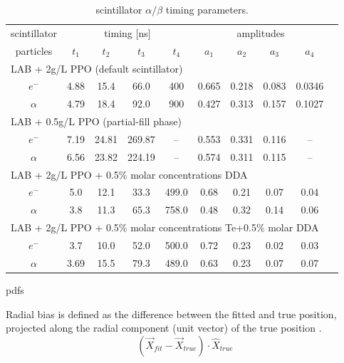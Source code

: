 \begin{table}[ht]
	\caption{\label{scint_timing} scintillator $\alpha/\beta$ timing parameters\cite{chicagoTiming,tanner0p5}.}	
	
	
	
	
	{\centering
		\begin{tabular*}{165mm}{c@{\extracolsep{\fill}}*9c}
			\toprule 
			\multicolumn{1}{c}{scintillator} & \multicolumn{4}{c}{timing [ns]} & \multicolumn{4}{c}{amplitudes}\\
			\cline{0-1}\cline{2-5} \cline{6-9}		
			 particles      & $t_1$ & $t_2$ & $t_3$ & $t_4$ & $a_1$ &$a_2$ &$a_3$&$a_4$\\
			\midrule
			\multicolumn{9}{l}{LAB + 2g/L PPO (default scintillator)}\\
			$e^-$ & 4.88 & 15.4 & 66.0 & 400 & 0.665 & 0.218 & 0.083& 0.0346\\	
		    $\alpha$ & 4.79 & 18.4 & 92.0 & 900 & 0.427 & 0.313 & 0.157 & 0.1027\\
		    \hline
		    \multicolumn{9}{l}{LAB + 0.5g/L PPO (partial-fill phase)} \\
			$e^-$& 7.19 & 24.81 & 269.87 & -- &0.553 &0.331 &0.116 & --\\
			$\alpha$& 6.56 &23.82 &224.19&--& 0.574&0.311& 0.115&--\\
			\hline
			\multicolumn{9}{l}{LAB + 2g/L PPO + 0.5\% molar concentrations DDA} \\
			$e^-$ & 5.0& 12.1& 33.3& 499.0& 0.68& 0.21& 0.07& 0.04\\
			$\alpha$ &3.8 &11.3& 65.3& 758.0& 0.48& 0.32& 0.14& 0.06 \\
			\hline
			\multicolumn{9}{l}{LAB + 2g/L PPO + 0.5\% molar concentrations Te+0.5\% molar DDA}\\
			$e^-$ & 3.7 & 10.0 & 52.0  & 500.0 & 0.72 & 0.23 & 0.02 &0.03\\
			$\alpha$ & 3.69 & 15.5 & 79.3  & 489.0 & 0.63 & 0.23 & 0.07 &0.07\\	
			\bottomrule	
		\end{tabular*}
	}
\end{table}


pdfs 



Radial bias is defined as the difference between the fitted and true position, projected along the radial component (unit vector) of the true position \cite{coulter2013modelling}.
\[
(\vec{X}_{fit}-\vec{X}_{true})\cdot \hat{X}_{true}
\]


